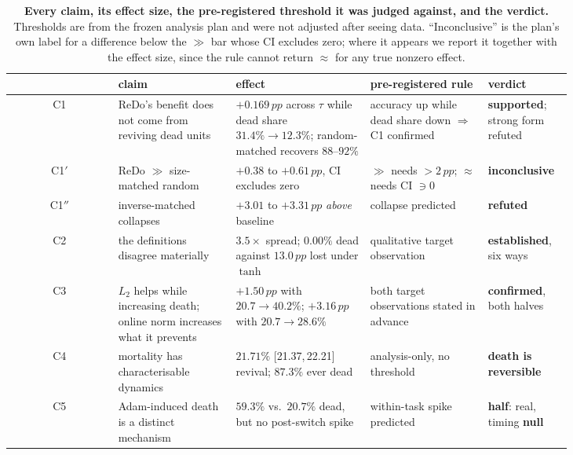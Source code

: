 \documentclass[10pt]{article}
\newcommand{\pp}{\,pp}
\newcommand{\ci}[2]{{\footnotesize[#1,\,#2]}}
\begin{document}
\begin{table}[t]
\centering
\caption{\textbf{Every claim, its effect size, the pre-registered threshold it
was judged against, and the verdict.} Thresholds are from the frozen analysis
plan and were not adjusted after seeing data. ``Inconclusive'' is the plan's own
label for a difference below the $\gg$ bar whose CI excludes zero; where it
appears we report it together with the effect size, since the rule cannot return
$\approx$ for any true nonzero effect.}
\label{tab:summary}
\small
\begin{tabular}{@{}c p{0.215\linewidth} p{0.245\linewidth} p{0.215\linewidth} p{0.155\linewidth}@{}}
\toprule
& \textbf{claim} & \textbf{effect} & \textbf{pre-registered rule} & \textbf{verdict} \\
\midrule
C1 & ReDo's benefit does not come from reviving dead units &
$+0.169\pp$ across $\tau$ while dead share $31.4\% \to 12.3\%$; random-matched
recovers $88$--$92\%$ &
accuracy up while dead share down $\Rightarrow$ C1 confirmed &
\textbf{supported}; strong form refuted \\
\addlinespace
C1$'$ & ReDo $\gg$ size-matched random &
$+0.38$ to $+0.61\pp$, CI excludes zero &
$\gg$ needs ${>}2\pp$; $\approx$ needs CI $\ni 0$ &
\textbf{inconclusive} \\
\addlinespace
C1$''$ & inverse-matched collapses \citep{sokar2023dormant} &
$+3.01$ to $+3.31\pp$ \emph{above} baseline &
collapse predicted &
\textbf{refuted} \\
\addlinespace
C2 & the definitions disagree materially &
$3.5\times$ spread; $0.00\%$ dead against $13.0\pp$ lost under $\tanh$ &
qualitative target observation &
\textbf{established}, six ways \\
\addlinespace
C3 & $L_2$ helps while increasing death; online norm increases what it prevents &
$+1.50\pp$ with $20.7 \to 40.2\%$; $+3.16\pp$ with $20.7 \to 28.6\%$ &
both target observations stated in advance &
\textbf{confirmed}, both halves \\
\addlinespace
C4 & mortality has characterisable dynamics &
$21.71\%$ \ci{21.37}{22.21} revival; $87.3\%$ ever dead &
analysis-only, no threshold &
\textbf{death is reversible} \\
\addlinespace
C5 & Adam-induced death is a distinct mechanism &
$59.3\%$ vs.\ $20.7\%$ dead, but no post-switch spike &
within-task spike predicted &
\textbf{half}: real, timing \textbf{null} \\
\bottomrule
\end{tabular}
\end{table}
\end{document}
